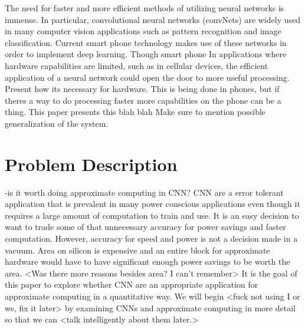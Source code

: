 \documentclass[conference]{IEEEtran}
\begin{document}
	\indent The need for faster and more efficient methods of utilizing neural networks is immense. In particular, convolutional neural networks (convNets) are widely used in many computer vision applications such as pattern recognition and image classification. Current smart phone technology makes use of these networks in order to implement deep learning. Though smart phone In applications where hardware capabilities are limited, such as in cellular devices, the efficient application of a neural network could open the door to more useful processing.  \\
	Present how its necessary for hardware. This is being done in phones, but if theres a way to do processing faster more capabilities on the phone can be a thing. 
	This paper presents this blah blah 
	Make sure to mention possible generalization of the system. 
	
\section{Problem Description}
-is it worth doing approximate computing in CNN?
CNN are a error tolerant application that is prevalent in many power conscious applications even though it requires a large amount of computation to train and use. It is an easy decision to want to trade some of that unnecessary accuracy for power savings and faster computation. However, accuracy for speed and power is not a decision made in a vacuum. Area on silicon is expensive and an entire block for approximate hardware would have to have significant enough power savings to be worth the area. <Was there more reasons besides area? I can't remember> It is the goal of this paper to explore whether CNN are an appropriate application for approximate computing in a quantitative way. We will begin <fuck not using I or we, fix it later> by examining CNNs and approximate computing in more detail so that we can <talk intelligently about them later.>
\end{document}

